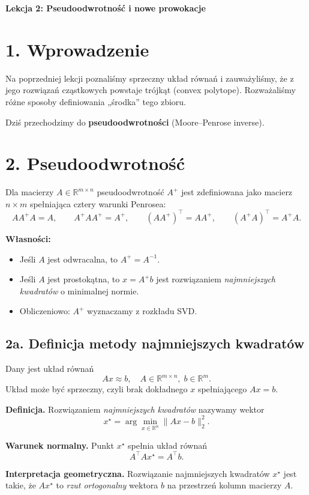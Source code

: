 \documentclass[12pt,a4paper]{article}
\begin{document}
\begin{center}
\Large \textbf{Lekcja 2: Pseudoodwrotność i nowe prowokacje}
\end{center}

\section*{1. Wprowadzenie}
Na poprzedniej lekcji poznaliśmy sprzeczny układ równań i zauważyliśmy, że 
z jego rozwiązań cząstkowych powstaje trójkąt (convex polytope). 
Rozważaliśmy różne sposoby definiowania „środka” tego zbioru.

Dziś przechodzimy do \textbf{pseudoodwrotności} (Moore--Penrose inverse).

\section*{2. Pseudoodwrotność}
Dla macierzy $A\in \mathbb{R}^{m\times n}$ pseudoodwrotność $A^+$ 
jest zdefiniowana jako macierz $n\times m$ spełniająca cztery warunki Penrosea:
\[
AA^+A=A,\qquad A^+AA^+=A^+,\qquad (AA^+)^\top=AA^+,\qquad (A^+A)^\top=A^+A.
\]

\textbf{Własności:}
\begin{itemize}
    \item Jeśli $A$ jest odwracalna, to $A^+=A^{-1}$.
    \item Jeśli $A$ jest prostokątna, to $x=A^+b$ jest rozwiązaniem \emph{najmniejszych kwadratów} o minimalnej normie.
    \item Obliczeniowo: $A^+$ wyznaczamy z rozkładu SVD.
\end{itemize}

\subsection*{2a. Definicja metody najmniejszych kwadratów}
Dany jest układ równań
\[
A x \approx b, \quad A\in \mathbb{R}^{m\times n},\; b\in\mathbb{R}^m.
\]
Układ może być sprzeczny, czyli brak dokładnego $x$ spełniającego $Ax=b$.

\medskip
\noindent
\textbf{Definicja.} Rozwiązaniem \emph{najmniejszych kwadratów} nazywamy wektor
\[
x^\star = \arg\min_{x\in\mathbb{R}^n} \|Ax-b\|_2^2.
\]

\medskip
\noindent
\textbf{Warunek normalny.} Punkt $x^\star$ spełnia układ równań
\[
A^\top A x^\star = A^\top b.
\]

\medskip
\noindent
\textbf{Interpretacja geometryczna.} Rozwiązanie najmniejszych kwadratów $x^\star$ jest takie, że $Ax^\star$ to \emph{rzut ortogonalny} wektora $b$ na przestrzeń kolumn macierzy $A$.
\end{document}

